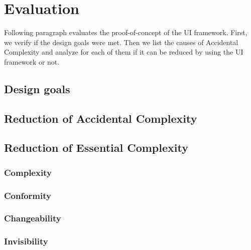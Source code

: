 \section{Evaluation}\label{evaluation}

Following paragraph evaluates the proof-of-concept of the UI framework. First, we verify if the design goals were met. Then we list the causes of Accidental Complexity and analyze for each of them if it can be reduced by using the UI framework or not.

\subsection{Design goals}\label{designgoals}

\subsection{Reduction of Accidental Complexity}\label{accidentalcomplexity}
\subsection{Reduction of Essential Complexity}\label{essentialcomplexity}
\subsubsection{Complexity}\label{complexity}
\subsubsection{Conformity}\label{conformity}
\subsubsection{Changeability}\label{changeability}
\subsubsection{Invisibility}\label{invisibility}
